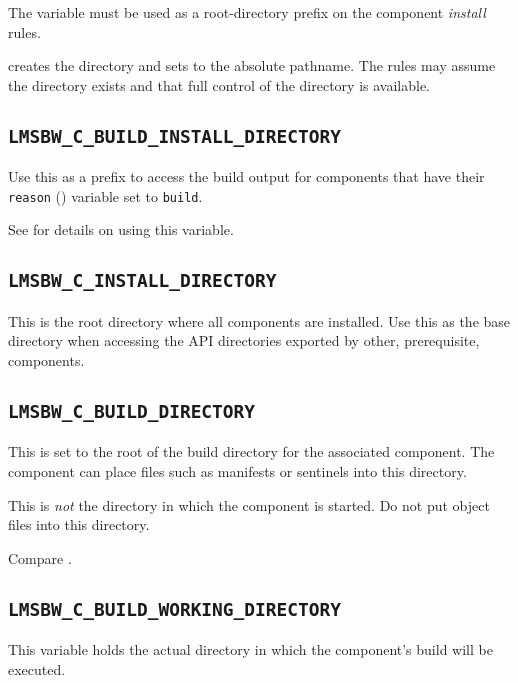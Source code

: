 The \destdir variable must be used as a root-directory prefix on the
component \emph{install} rules.

\lmsbw creates the directory and sets \destdir to the absolute
pathname.  The rules may assume the directory exists and that full
control of the directory is available.


\subsection{\texttt{LMSBW\_C\_BUILD\_INSTALL\_DIRECTORY}}\label{wrap:build-install-directory}

Use this as a prefix to access the build output for components that
have their \texttt{reason} () variable set to
\texttt{build}.

See  for details on using this variable.

\subsection{\texttt{LMSBW\_C\_INSTALL\_DIRECTORY}}

This is the root directory where all components are installed.  Use
this as the base directory when accessing the API directories exported
by other, prerequisite, components.

\subsection{\texttt{LMSBW\_C\_BUILD\_DIRECTORY}}\label{wrap:lmsbw-c-build-directory}

This is set to the root of the build directory for the associated
component.  The component \makefile can place files such as \mtree
manifests or \make sentinels into this directory.

This is \emph{not} the directory in which the component \makefile is
started.   Do not put object files into this directory.

Compare .

\subsection{\texttt{LMSBW\_C\_BUILD\_WORKING\_DIRECTORY}}\label{wrap:lmsbw-c-build-working-directory}

This variable holds the actual directory in which the component's
build will be executed.

